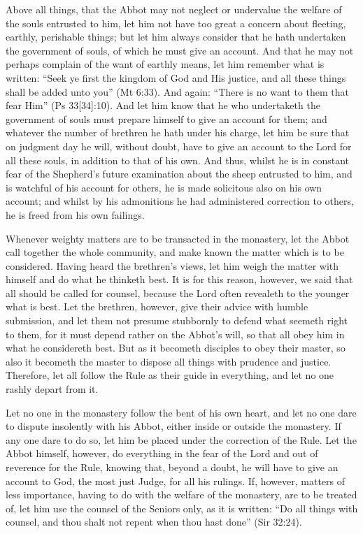 Above all things, that the Abbot may not neglect or undervalue the welfare of the souls entrusted to him, let him not have too great a concern about fleeting, earthly, perishable things; but let him always consider that he hath undertaken the government of souls, of which he must give an account. And that he may not perhaps complain of the want of earthly means, let him remember what is written: ``Seek ye first the kingdom of God and His justice, and all these things shall be added unto you'' (Mt 6:33). And again: ``There is no want to them that fear Him'' (Ps 33[34]:10). And let him know that he who undertaketh the government of souls must prepare himself to give an account for them; and whatever the number of brethren he hath under his charge, let him be sure that on judgment day he will, without doubt, have to give an account to the Lord for all these souls, in addition to that of his own. And thus, whilst he is in constant fear of the Shepherd's future examination about the sheep entrusted to him, and is watchful of his account for others, he is made solicitous also on his own account; and whilst by his admonitions he had administered correction to others, he is freed from his own failings.


Whenever weighty matters are to be transacted in the monastery, let the Abbot call together the whole community, and make known the matter which is to be considered. Having heard the brethren's views, let him weigh the matter with himself and do what he thinketh best. It is for this reason, however, we said that all should be called for counsel, because the Lord often revealeth to the younger what is best. Let the brethren, however, give their advice with humble submission, and let them not presume stubbornly to defend what seemeth right to them, for it must depend rather on the Abbot's will, so that all obey him in what he considereth best. But as it becometh disciples to obey their master, so also it becometh the master to dispose all things with prudence and justice. Therefore, let all follow the Rule as their guide in everything, and let no one rashly depart from it.

Let no one in the monastery follow the bent of his own heart, and let no one dare to dispute insolently with his Abbot, either inside or outside the monastery. If any one dare to do so, let him be placed under the correction of the Rule. Let the Abbot himself, however, do everything in the fear of the Lord and out of reverence for the Rule, knowing that, beyond a doubt, he will have to give an account to God, the most just Judge, for all his rulings. If, however, matters of less importance, having to do with the welfare of the monastery, are to be treated of, let him use the counsel of the Seniors only, as it is written: ``Do all things with counsel, and thou shalt not repent when thou hast done'' (Sir 32:24).


